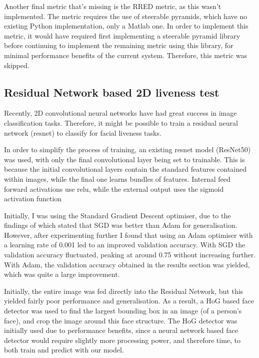 \documentclass[10pt,a4paper]{article}
\begin{document}
        Another final metric that's missing is the RRED metric, as this wasn't implemented. The metric requires the use of steerable pyramids, which have no existing Python implementation, only a Matlab one. In order to implement this metric, it would have required first implementing a steerable pyramid library
        before continuing to implement the remaining metric using this library, for minimal performance benefits of the current system. Therefore, this metric was skipped. \cite{RRED}


    \subsection{Residual Network based 2D liveness test}
        Recently, 2D convolutional neural networks have had great success in image classification tasks. Therefore, it might be possible to train
        a residual neural network (resnet) to classify for facial liveness tasks.

        In order to simplify the process of training, an existing resnet model (ResNet50) was used, with only the final convolutional layer being
        set to trainable. This is because the initial convolutional layers contain the standard features contained within images, while the final one
        learns bundles of features. Internal feed forward activations use relu, while the external output uses the sigmoid activation function

        Initially, I was using the Standard Gradient Descent optimiser, due to the findings of \cite{SGDBetterThanAdamForImageClassification} which stated
        that SGD was better than Adam for generalisation. However, after experimenting further I found that using an Adam optimiser with a learning rate of 0.001
        led to an improved validation accuracy. With SGD the validation accuracy fluctuated, peaking at around 0.75 without increasing further. With Adam, the
        validation accuracy obtained in the results section was yielded, which was quite a large improvement.

        Initially, the entire image was fed directly into the Residual Network, but this yielded fairly poor performance and generalisation. As a result,
        a HoG based face detector was used to find the largest bounding box in an image (of a person's face), and crop the image around this face structure. The HoG detector was
        initially used due to performance benefits, since a neural network based face detector would require slightly more processing power, and therefore time, to both train and
        predict with our model.
\end{document}
